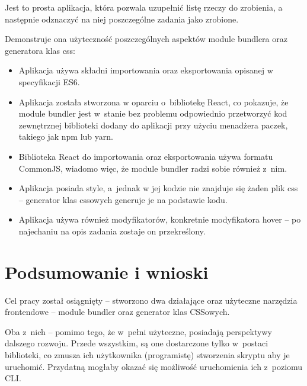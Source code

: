 \documentclass{SGGW-thesis}
\begin{document}
Jest to prosta aplikacja, która pozwala uzupełnić listę rzeczy do zrobienia, a następnie odznaczyć na niej poszczególne zadania jako zrobione.

Demonstruje ona użyteczność poszczególnych aspektów module bundlera oraz generatora klas css:
\begin{itemize}
    \item Aplikacja używa składni importowania oraz eksportowania opisanej w specyfikacji ES6.
    \item Aplikacja została stworzona w oparciu o~bibliotekę React, co pokazuje, że module bundler jest w~stanie bez problemu odpowiednio przetworzyć kod zewnętrznej biblioteki dodany do aplikacji przy użyciu menadżera paczek, takiego jak npm lub yarn.
    \item Biblioteka React do importowania oraz eksportowania używa formatu CommonJS, wiadomo więc, że module bundler radzi sobie również z~nim.
    \item Aplikacja posiada style, a~jednak w jej kodzie nie znajduje się żaden plik css -- generator klas cssowych generuje je na podstawie kodu.
    \item Aplikacja używa również modyfikatorów, konkretnie modyfikatora hover -- po najechaniu na opis zadania zostaje on przekreślony.
\end{itemize}

\chapter{Podsumowanie i wnioski}
Cel pracy został osiągnięty -- stworzono dwa działające oraz użyteczne narzędzia frontendowe -- module bundler oraz generator klas CSSowych.

Oba z~nich -- pomimo tego, że w~pełni użyteczne, posiadają perspektywy dalszego rozwoju.
Przede wszystkim, są one dostarczone tylko w~postaci biblioteki, co zmusza ich użytkownika (programistę) stworzenia skryptu aby je uruchomić. Przydatną mogłaby okazać się możliwość uruchomienia ich z~poziomu CLI.
\end{document}

